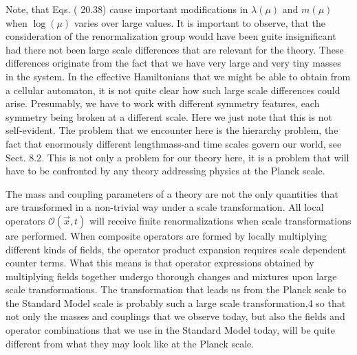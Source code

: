 \documentclass[main.tex]{subfiles}
\begin{document}
Note, that Eqs. ( 20.38) cause important modifications in $\lambda(\mu)$ and $m(\mu)$ when $\log (\mu)$ varies over large values. It is important to observe, that the consideration of the renormalization group would have been guite insignificant had there not been large scale differences that are relevant for the theory. These differences originate from the fact that we have very large and very tiny masses in the system. In the effective Hamiltonians that we might be able to obtain from a cellular automaton, it is not quite clear how such large scale differences could arise. Presumably, we have to work with different symmetry features, each symmetry being broken at a different scale. Here we just note that this is not self-evident. The problem that we encounter here is the hierarchy problem, the fact that enormously different lengthmass-and time scales govern our world, see Sect. $8.2 .$ This is not only a problem for our theory here, it is a problem that will have to be confronted by any theory addressing physics at the Planck scale.

The mass and coupling parameters of a theory are not the only quantities that are transformed in a non-trivial way under a scale transformation. All local operators $\mathcal{O}(\vec{x}, t)$ will receive finite renormalizations when scale transformations are performed. When composite operators are formed by locally multiplying different kinds of fields, the operator product expansion requires scale dependent counter terms. What this means is that operator expressions obtained by multiplying fields together undergo thorough changes and mixtures upon large scale transformations. The transformation that leads us from the Planck scale to the Standard Model scale is probably such a large scale transformation,4 so that not only the masses and couplings that we observe today, but also the fields and operator combinations that we use in the Standard Model today, will be quite different from what they may look
like at the Planck scale.
\end{document}
